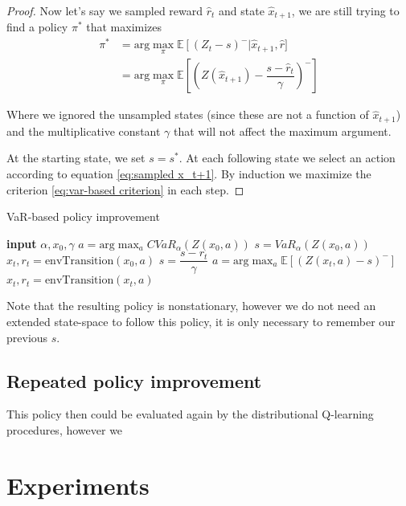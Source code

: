 \begin{proof}
Now let's say we sampled reward $\hat{r}_t$ and state $\hat{x}_{t+1}$, we are still trying to find a policy $\pi^*$ that maximizes 
\begin{equation}\label{eq:sampled x_t+1}
\begin{split}
\pi^* &=\text{arg}\max_\pi \mathbb{E}\left[(Z_t-s)^-\right | \hat{x}_{t+1}, \hat{r}]\\
&= \text{arg}\max_\pi \mathbb{E}\left[\left(Z(\hat{x}_{t+1}) - \dfrac{s - \hat{r}_t}{\gamma}\right)^-\right]
\end{split}
\end{equation}

Where we ignored the unsampled states (since these are not a function of $\hat{x}_{t+1}$) and the multiplicative constant $\gamma$ that will not affect the maximum argument.

At the starting state, we set $s=s^*$. At each following state we select an action according to equation \ref{eq:sampled x_t+1}. By induction we maximize the criterion \ref{eq:var-based criterion} in each step.
\end{proof}

\begin{algorithm}
\caption{VaR-based policy improvement}
\label{alg:var}
\begin{algorithmic}
    \STATE \textbf{input} $\alpha, x_0, \gamma$
    \STATE $a = \text{arg}\max_a CVaR_\alpha(Z(x_0, a))$
    \STATE $s = VaR_\alpha(Z(x_0, a))$
    \STATE $x_t, r_t = \text{envTransition}(x_0, a)$
    	\STATE $s = \dfrac{s-r_t}{\gamma}$
    	\STATE $a = \text{arg}\max_a \mathbb{E}\left[(Z(x_t, a)-s)^- \right]$
    	\STATE $x_t, r_t = \text{envTransition}(x_t, a)$
   	\ENDWHILE
\end{algorithmic}
\end{algorithm}

Note that the resulting policy is nonstationary, however we do not need an extended state-space to follow this policy, it is only necessary to remember our previous $s$.

\subsection{Repeated policy improvement}
This policy then could be evaluated again by the distributional Q-learning procedures, however we 


\section{Experiments}\label{sec:qexperiments}


